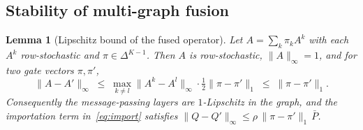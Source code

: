 \documentclass[conference]{IEEEtran}
\newtheorem{lemma}{Lemma}
\begin{document}
\subsection{Stability of multi-graph fusion}

\begin{lemma}[Lipschitz bound of the fused operator]\label{lem:lip}
Let $A=\sum_k\pi_k A^k$ with each $A^k$ row-stochastic and $\pi\in\Delta^{K-1}$. Then $A$ is row-stochastic, $\|A\|_\infty=1$, and for two gate vectors $\pi,\pi'$,
\begin{equation}
\|A-A'\|_\infty \;\le\; \max_{k\neq l}\|A^k-A^l\|_\infty \cdot \tfrac12\|\pi-\pi'\|_1 \;\le\; \|\pi-\pi'\|_1 .
\end{equation}
Consequently the message-passing layers are $1$-Lipschitz in the graph, and the importation term in~\eqref{eq:import} satisfies $\|Q-Q'\|_\infty\le \rho\,\|\pi-\pi'\|_1\,\bar P$.
\end{lemma}
\end{document}
